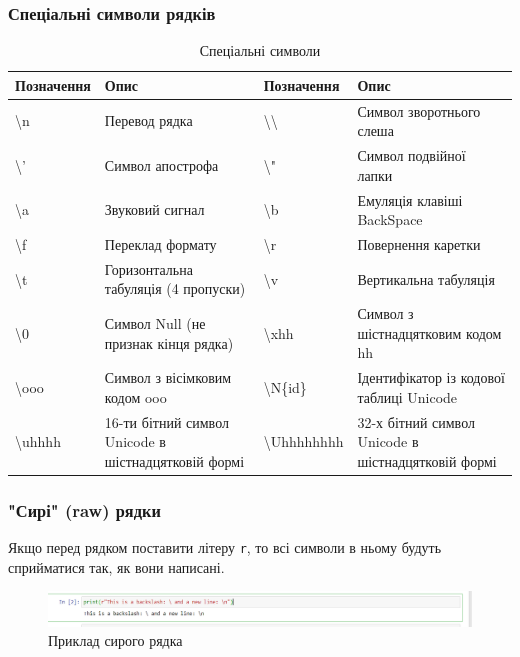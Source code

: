 \begin{frame}
\frametitle{Спеціальні символи рядків}
\tiny{
\begin{table}
  \caption{Спеціальні символи}
  \label{tab:}

  \begin{center}
    \begin{tabular}{|p{1.2cm}|p{3.5cm}|p{1.2cm}|p{3.5cm}|}
    \hline
     \textbf{Позначення}  & \textbf{Опис} & \textbf{Позначення}  & \textbf{Опис} \\
     \hline
      \textbackslash n & Перевод рядка & \textbackslash \textbackslash & Символ зворотнього слеша \\
     \hline
           \textbackslash ' & Символ апострофа & \textbackslash " & Символ подвійної лапки \\
     \hline
           \textbackslash a & Звуковий сигнал & \textbackslash b & Емуляція клавіші BackSpace \\
     \hline
           \textbackslash f & Переклад формату & \textbackslash r & Повернення каретки \\
     \hline
           \textbackslash t & Горизонтальна табуляція (4 пропуски) & \textbackslash v & Вертикальна табуляція \\
     \hline
           \textbackslash 0 & Символ Null (не признак кінця рядка) & \textbackslash xhh & Символ з шістнадцятковим кодом hh \\
     \hline
           \textbackslash ooo & Символ з вісімковим кодом ooo  & \textbackslash N\{id\} & Ідентифікатор із кодової таблиці Unicode \\
     \hline
           \textbackslash uhhhh & 16-ти бітний символ Unicode в шістнадцятковій формі & \textbackslash Uhhhhhhhh &  32-х бітний символ Unicode в шістнадцятковій формі\\
     \hline
    \end{tabular}
  \end{center}
\end{table}
}
\end{frame}

\begin{frame}
\frametitle{"Сирі" (raw) рядки}
Якщо перед рядком поставити літеру \texttt{r}, то всі символи в ньому будуть сприйматися так, як вони написані.
\begin{figure}
\begin{center}
 \includegraphics[width=\textwidth]{pictures/raw_string.png}
\caption{Приклад сирого рядка}
\label{raw_string} 
\end{center}
\end{figure}
\end{frame}

